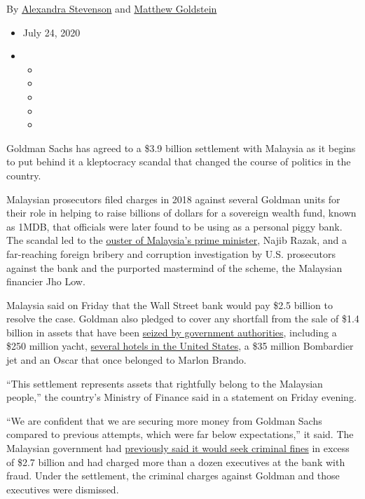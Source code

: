 By
\href{https://www.nytimes3xbfgragh.onion/by/alexandra-stevenson}{Alexandra
Stevenson} and
\href{https://www.nytimes3xbfgragh.onion/by/matthew-goldstein}{Matthew
Goldstein}

\begin{itemize}
\item
  July 24, 2020
\item
  \begin{itemize}
  \item
  \item
  \item
  \item
  \item
  \end{itemize}
\end{itemize}

Goldman Sachs has agreed to a \$3.9 billion settlement with Malaysia as
it begins to put behind it a kleptocracy scandal that changed the course
of politics in the country.

Malaysian prosecutors filed charges in 2018 against several Goldman
units for their role in helping to raise billions of dollars for a
sovereign wealth fund, known as 1MDB, that officials were later found to
be using as a personal piggy bank. The scandal led to the
\href{https://www.nytimes3xbfgragh.onion/2018/05/15/world/asia/malaysia-najib-razak-fall.html}{ouster
of Malaysia's prime minister}, Najib Razak, and a far-reaching foreign
bribery and corruption investigation by U.S. prosecutors against the
bank and the purported mastermind of the scheme, the Malaysian financier
Jho Low.

Malaysia said on Friday that the Wall Street bank would pay \$2.5
billion to resolve the case. Goldman also pledged to cover any shortfall
from the sale of \$1.4 billion in assets that have been
\href{https://www.nytimes3xbfgragh.onion/2018/12/09/arts/jho-low-1mdb-assets-piano.html}{seized
by government authorities}, including a \$250 million yacht,
\href{https://www.nytimes3xbfgragh.onion/2020/07/03/business/viceroy-beverly-hills-1MDB-fraud.html}{several
hotels in the United States}, a \$35 million Bombardier jet and an Oscar
that once belonged to Marlon Brando.

``This settlement represents assets that rightfully belong to the
Malaysian people,'' the country's Ministry of Finance said in a
statement on Friday evening.

``We are confident that we are securing more money from Goldman Sachs
compared to previous attempts, which were far below expectations,'' it
said. The Malaysian government had
\href{https://www.nytimes3xbfgragh.onion/2018/12/17/business/goldman-sachs-malaysia-criminal-charges-1mdb.html}{previously
said it would seek criminal fines} in excess of \$2.7 billion and had
charged more than a dozen executives at the bank with fraud. Under the
settlement, the criminal charges against Goldman and those executives
were dismissed.

